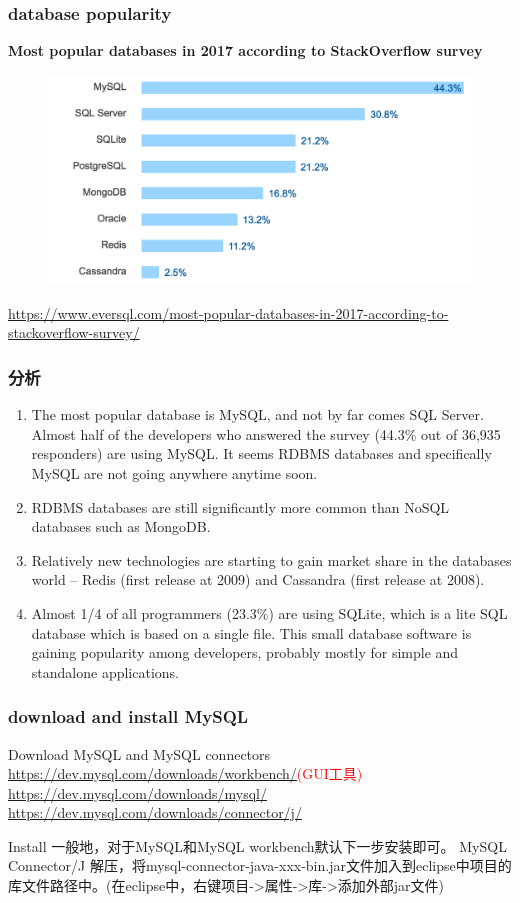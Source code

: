 \documentclass{beamer}
\begin{document}
\begin{frame}
\frametitle{database popularity}
\textbf{Most popular databases in 2017 according to StackOverflow survey}
\begin{figure}
\includegraphics[width=1\linewidth]{sql1.png}
\end{figure}
\url{https://www.eversql.com/most-popular-databases-in-2017-according-to-stackoverflow-survey/}
\end{frame}
\begin{frame}
\frametitle{分析}
\begin{enumerate}
\item
The most popular database is MySQL, and not by far comes SQL Server. Almost half of the developers who answered the survey (44.3\% out of 36,935 responders) are using MySQL. It seems RDBMS databases and specifically MySQL are not going anywhere anytime soon.

\item
RDBMS databases are still significantly more common than NoSQL databases such as MongoDB.
\item
Relatively new technologies are starting to gain market share in the databases world – Redis (first release at 2009) and Cassandra (first release at 2008).
\item
Almost 1/4 of all programmers (23.3\%) are using SQLite, which is a lite SQL database which is based on a single file. This small database software is gaining popularity among developers, probably mostly for simple and standalone applications.

\end{enumerate}
\end{frame}
\begin{frame}
\frametitle{download and install MySQL}
\begin{block}{Download MySQL and MySQL connectors}
\url{https://dev.mysql.com/downloads/workbench/}\textcolor{red}{(GUI工具)}
\url{https://dev.mysql.com/downloads/mysql/}
\url{https://dev.mysql.com/downloads/connector/j/}
\end{block}
\begin{block}{Install}
一般地，对于MySQL和MySQL workbench默认下一步安装即可。
MySQL Connector/J 解压，将mysql-connector-java-xxx-bin.jar文件加入到eclipse中项目的库文件路径中。(在eclipse中，右键项目->属性->库->添加外部jar文件)
\end{block}
\end{frame}
\end{document}
